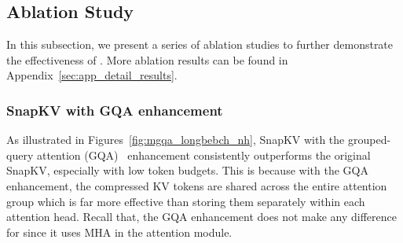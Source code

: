 \begin{figure*}[!t]
    \centering
    \hfill
    \hfill
    \caption{LongBench and \needle accuracy comparison between SnapKV and SnapKV with GQA enhancement.}
    \label{fig:mgqa_longbebch_nh}
\end{figure*}

\subsection{Ablation Study}
\label{sec:ablation}

In this subsection, we present a series of ablation studies to further demonstrate the effectiveness of \rocketkv. More ablation results can be found in Appendix~\ref{sec:app_detail_results}. 
\subsubsection{SnapKV with GQA enhancement}
As illustrated in Figures~\ref{fig:mgqa_longbebch_nh}, SnapKV with the grouped-query attention (GQA)~\cite{gqa2023} enhancement consistently outperforms the original SnapKV, especially with low token budgets. This is because with the GQA enhancement, the compressed KV tokens are shared across the entire attention group which is far more effective than storing them separately within each attention head.
Recall that, the GQA enhancement does not make any difference for \longchat since it uses MHA in the attention module. 




